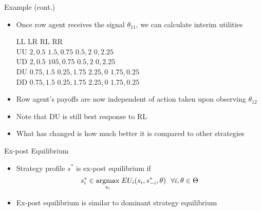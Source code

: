 \documentclass[11pt,aspectratio=169,handout]{beamer}
\begin{document}
  
  \begin{frame}{Example (cont.)}
   \begin{itemize}[<+->]
    \item Once row agent receives the signal $\theta_{11}$, we can calculate interim utilities
    \vspace{1em}
    \begin{center}\small
     \hspace{-4.9em}
     \begin{game}{4}{4}
      	\> LL			\> LR		\> RL		\> RR		\\
      UU	\> $2,0.5$		\> $1.5,0.75$	\> $0.5,2$	\> $0,2.25$	\\
      UD	\> $2,0.5$		\> $105,0.75$ 	\> $0.5,2$	\> $0,2.25$	\\
      DU	\> $0.75,1.5$	\> $0.25,1.75$	\> $2.25,0$	\> $1.75,0.25$	\\
      DD	\> $0.75,1.5$	\> $0.25,1.75$	\> $2.25,0$	\> $1.75,0.25$	\\
     \end{game}
    \end{center}
    \vspace{1em}
    \item Row agent's payoffs are now \alert{independent} of action taken upon observing $\theta_{12}$
    \item Note that DU is \alert{still best response} to RL
    \item What has changed is how much better it is compared to other strategies
   \end{itemize}
  \end{frame}


  \begin{frame}{Ex-post Equilibrium}
    \begin{itemize}[<+->]
    \setlength{\itemsep}{1.2em}
     \item Strategy profile $s^*$ is \alert{ex-post equilibrium} if
     $$s^*_i \in \underset{s_i}{\operatorname*{argmax}} \; EU_i(s_i,s^*_{-i},\theta) ~~ \forall i, \theta \in \Theta$$
     \item Ex-post equilibrium is similar to \alert{dominant strategy equilibrium}
    \end{itemize}
  \end{frame}
  
\end{document}
